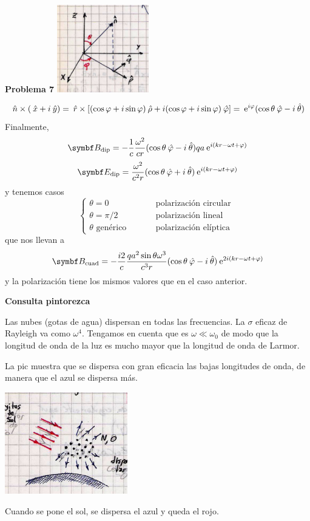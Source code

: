 \documentclass[10pt,oneside]{CBFT_book}
\begin{document}
\begin{ejemplo}{\bf Problema 7}
\includegraphics[width=0.3\textwidth]{images/fig_ft1_versoretes_polares.jpg} 

\[
	\:\hat{n} \times (\:\hat{x} + i\:\hat{y} ) = 
	\:\hat{r} \times [ ( \cos\varphi + i\sin\varphi )\:\hat{\rho} + i( \cos\varphi + i\sin\varphi )\:\hat{\varphi}] =
	\:\mathrm{e}^{i\varphi}(\cos\theta \:\hat{\varphi} - i \:\hat{\theta})
\]
Finalmente,
\[
	\vb{B}_\text{dip} = - \frac{1}{c} \frac{\omega^2}{cr} (\cos\theta \phiver - i \thetaver)
	q a \euler^{i(kr-\omega t+\vp)}
\]
\[
	\vb{E}_\text{dip} = \frac{\omega^2}{c^2r} (\cos\theta \phiver + i \thetaver)
	\euler^{i(kr-\omega t+\vp)}
\]
y tenemos casos
\[
	\begin{cases}
	\theta = 0 \qquad &\text{ polarización circular } \\
	\theta = {\pi}/{2} \qquad &\text{ polarización lineal } \\
	\theta \text{ genérico } \qquad &\text{ polarización elíptica} 
	\end{cases}
\]
que nos llevan a
\[
	\vb{B}_\text{cuad} = - \frac{i2}{c} \frac{qa^2\sin\theta \omega^3}{c^3r} (\cos\theta \phiver - i \thetaver)
	\euler^{2i(kr-\omega t+\vp)}
\]
y la polarización tiene los mismos valores que en el caso anterior.
 
\end{ejemplo}


\begin{ejemplo}{\bf Consulta pintorezca}

Las nubes (gotas de agua) dispersan en todas las frecuencias.
La $\sigma$ eficaz de Rayleigh va como $\omega^4$.
Tengamos en cuenta que es $\omega \ll \omega_0$ de modo que la longitud de onda de la luz
es mucho mayor que la longitud de onda de Larmor.

La pic muestra que se dispersa con gran eficacia las bajas longitudes de onda, de manera que el
azul se dispersa más.

\includegraphics[width=0.4\textwidth]{images/fig_ft1_dispersion_sol.jpg}	

Cuando se pone el sol, se dispersa el azul y queda el rojo.
 
\end{ejemplo}
\end{document}
